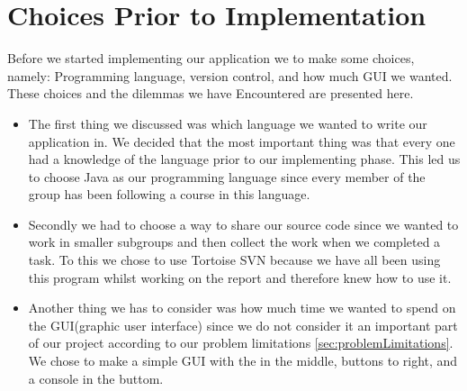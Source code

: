\chapter{Choices Prior to Implementation}
Before we started implementing our application we to make some choices, namely: Programming language, version control, and how much GUI we wanted.
These choices and the dilemmas we have Encountered are presented here.

\begin{itemize}
	\item The first thing we discussed was which language we wanted to write our application in.
We decided that the most important thing was that every one had a knowledge of the language prior to our implementing phase.
This led us to choose Java as our programming language since every member of the group has been following a course in this language.

	\item Secondly we had to choose a way to share our source code since we wanted to work in smaller subgroups and then collect the work when we completed a task.
To this we chose to use Tortoise SVN because we have all been using this program whilst working on the report and therefore knew how to use it.

	\item Another thing we has to consider was how much time we wanted to spend on the GUI(graphic user interface) since we do not consider it an important part of our project according to our problem limitations \ref{sec:problemLimitations}.
We chose to make a simple GUI with the \rubik{} in the middle, buttons to right, and a console in the buttom.
\end{itemize}

